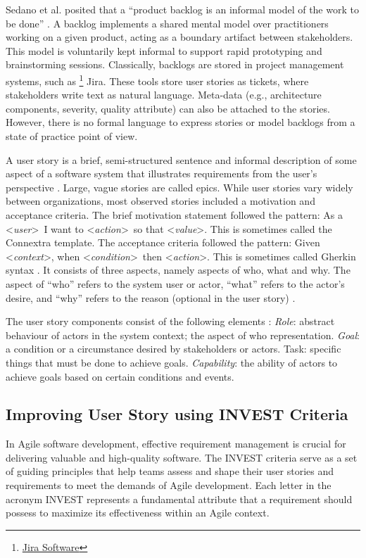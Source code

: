 Sedano et al. posited that a “product backlog is an informal model of the work to be done” \cite{sedano2019product}. A backlog implements a shared mental model over practitioners working on a given product, acting as a boundary artifact between stakeholders. This model is voluntarily kept informal to support rapid prototyping and brainstorming sessions. Classically, backlogs are stored in project management systems, such as \footnote{\href{https://www.atlassian.com/en/software/jira}{Jira Software}} Jira. These tools store user stories as tickets, where stakeholders write text as natural language. Meta-data (e.g., architecture components, severity, quality attribute) can also be attached to the stories. However, there is no formal language to express stories or model backlogs from a state of practice point of view.

A user story is a brief, semi-structured sentence and informal description of some aspect of a software system that illustrates requirements from the user’s perspective \cite{raharjana2021user}. Large, vague stories are called epics. While user stories vary widely between organizations, most observed stories included a motivation and acceptance criteria. The brief motivation statement followed the pattern:  As a  \textless\emph{user}\textgreater\ I want to \textless\emph{action}\textgreater\ so that \textless\emph{value}\textgreater. This is sometimes called the Connextra template. The acceptance criteria followed the pattern: Given \textless\emph{context}\textgreater, when \textless\emph{condition}\textgreater \  then \textless\emph{action}\textgreater. This is sometimes called Gherkin syntax \cite{wynne2017cucumber}. It consists of three aspects, namely aspects of who, what and why. The aspect of “who” refers to the system user or actor, “what” refers to the actor’s desire, and “why” refers to the reason (optional in the user story) \cite{raharjana2021user}.

The user story components consist of the following elements \cite{wautelet2017user} : \emph{Role}: abstract behaviour of actors in the system context; the aspect of who representation. \emph{Goal}: a condition or a circumstance desired by stakeholders or actors. Task: specific things that must be done to achieve goals. \emph{Capability}: the ability of actors to achieve goals based on certain conditions and events.
\subsection{Improving User Story using INVEST Criteria} \label{invest}
In Agile software development, effective requirement management is crucial for delivering valuable and high-quality software. The INVEST criteria serve as a set of guiding principles that help teams assess and shape their user stories and requirements to meet the demands of Agile development. Each letter in the acronym INVEST represents a fundamental attribute that a requirement should possess to maximize its effectiveness within an Agile context.

